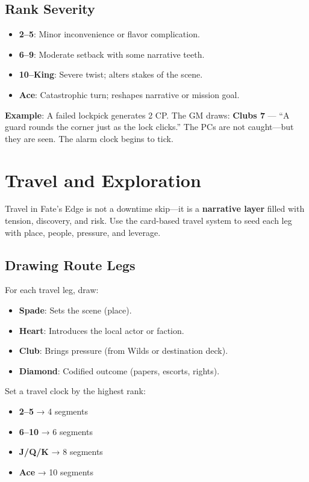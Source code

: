 \subsection*{Rank Severity}

\begin{itemize}
    \item \textbf{2–5}: Minor inconvenience or flavor complication.
    \item \textbf{6–9}: Moderate setback with some narrative teeth.
    \item \textbf{10–King}: Severe twist; alters stakes of the scene.
    \item \textbf{Ace}: Catastrophic turn; reshapes narrative or mission goal.
\end{itemize}

\textbf{Example}: A failed lockpick generates 2 CP. The GM draws: \textbf{Clubs 7} — “A guard rounds the corner just as the lock clicks.” The PCs are not caught—but they are seen. The alarm clock begins to tick.

\section*{Travel and Exploration}

Travel in Fate’s Edge is not a downtime skip—it is a \textbf{narrative layer} filled with tension, discovery, and risk. Use the card-based travel system to seed each leg with place, people, pressure, and leverage.

\subsection*{Drawing Route Legs}

For each travel leg, draw:

\begin{itemize}
    \item \textbf{Spade}: Sets the scene (place).
    \item \textbf{Heart}: Introduces the local actor or faction.
    \item \textbf{Club}: Brings pressure (from Wilds or destination deck).
    \item \textbf{Diamond}: Codified outcome (papers, escorts, rights).
\end{itemize}

Set a travel clock by the highest rank:
\begin{itemize}
    \item \textbf{2–5} → 4 segments
    \item \textbf{6–10} → 6 segments
    \item \textbf{J/Q/K} → 8 segments
    \item \textbf{Ace} → 10 segments
\end{itemize}

